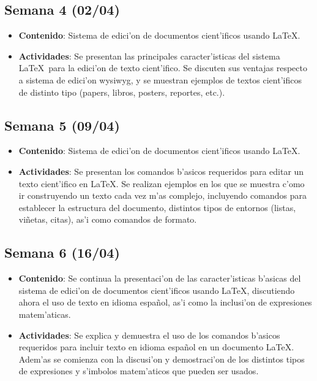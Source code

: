 \documentclass[letterpaper,11pt]{exam}
\begin{document}
\begin{multicols}{2}
\begin{scriptsize}
\subsection*{Semana 4 (02/04)}
\begin{itemize}
\item \textbf{Contenido}: Sistema de edici'on de documentos cient'ificos usando \LaTeX. 
\item \textbf{Actividades}: Se presentan las principales caracter'isticas del sistema \LaTeX\ para la edici'on de texto cient'ifico. Se discuten sus ventajas respecto a sistema de edici'on wysiwyg, y se muestran ejemplos de textos cient'ificos de distinto tipo (papers, libros, posters, reportes, etc.).
\end{itemize}

\subsection*{Semana 5 (09/04)}
\begin{itemize}
\item \textbf{Contenido}: Sistema de edici'on de documentos cient'ificos usando \LaTeX.
\item \textbf{Actividades}: Se presentan los comandos b'asicos requeridos para editar un texto cient'ifico en \LaTeX. Se realizan ejemplos en los que se muestra c'omo ir construyendo un texto cada vez m'as complejo, incluyendo comandos para establecer la estructura del documento, distintos tipos de entornos (listas, vi\~netas, citas), as'i como comandos de formato.
\end{itemize}

\subsection*{Semana 6 (16/04)}
\begin{itemize}
\item \textbf{Contenido}: Se continua la presentaci'on de las caracter'isticas b'asicas del sistema de edici'on de documentos cient'ificos usando \LaTeX, discutiendo ahora el uso de texto en idioma espa\~nol, as'i como la inclusi'on de expresiones matem'aticas.
\item \textbf{Actividades}: Se explica y demuestra el uso de los comandos b'asicos requeridos para incluir texto en idioma espa\~nol en un documento \LaTeX. Adem'as se comienza con la discusi'on y demostraci'on de los distintos tipos de expresiones y s'imbolos matem'aticos que pueden ser usados.
\end{itemize}


\end{scriptsize}
\end{multicols}
\end{document}

